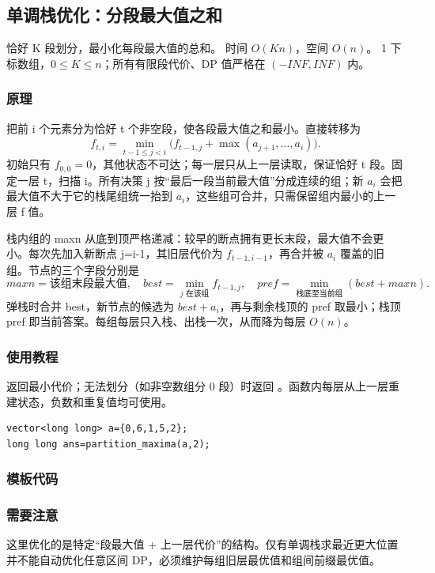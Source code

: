 \subsection{单调栈优化：分段最大值之和}
\label{dp:stack-optimization}
\AlgorithmInfo
    {恰好 K 段划分，最小化每段最大值的总和。}
    {时间 $O(Kn)$，空间 $O(n)$。}
    {1 下标数组，$0\le K\le n$；所有有限段代价、DP 值严格在 $(-INF,INF)$ 内。}
\subsubsection*{原理}

把前 i 个元素分为恰好 t 个非空段，使各段最大值之和最小。直接转移为
\[
 f_{t,i}=\min_{t-1\le j<i}\bigl(f_{t-1,j}+\max(a_{j+1},\ldots,a_i)\bigr).
\]
初始只有 $f_{0,0}=0$，其他状态不可达；每一层只从上一层读取，保证恰好 t 段。固定一层 t，扫描 i。所有决策 j 按“最后一段当前最大值”分成连续的组；新 $a_i$ 会把最大值不大于它的栈尾组统一抬到 $a_i$，这些组可合并，只需保留组内最小的上一层 f 值。

栈内组的 maxn 从底到顶严格递减：较早的断点拥有更长末段，最大值不会更小。每次先加入新断点 j=i-1，其旧层代价为 $f_{t-1,i-1}$，再合并被 $a_i$ 覆盖的旧组。节点的三个字段分别是
\[
 maxn=\text{该组末段最大值},\quad
 best=\min_{j\text{ 在该组}} f_{t-1,j},\quad
 pref=\min_{\text{栈底至当前组}}(best+maxn).
\]
弹栈时合并 best，新节点的候选为 $best+a_i$，再与剩余栈顶的 pref 取最小；栈顶 pref 即当前答案。每组每层只入栈、出栈一次，从而降为每层 $O(n)$。

\subsubsection*{使用教程}
 返回最小代价；无法划分（如非空数组分 0 段）时返回 。函数内每层从上一层重建状态，负数和重复值均可使用。
\begin{lstlisting}[style=mtycpp,numbers=none]
vector<long long> a={0,6,1,5,2};
long long ans=partition_maxima(a,2);
\end{lstlisting}
\subsubsection*{模板代码}
\subsubsection*{需要注意}
这里优化的是特定“段最大值 + 上一层代价”的结构。仅有单调栈求最近更大位置并不能自动优化任意区间 DP，必须维护每组旧层最优值和组间前缀最优值。
